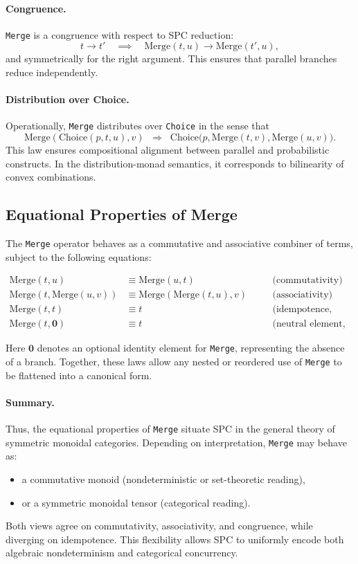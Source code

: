 \documentclass{article}
\begin{document}
\paragraph{Congruence.}
\texttt{Merge} is a congruence with respect to SPC reduction:
\[
t \to t' \quad\implies\quad
\mathrm{Merge}(t,u) \to \mathrm{Merge}(t',u),
\]
and symmetrically for the right argument. This ensures that parallel branches 
reduce independently.

\paragraph{Distribution over Choice.}
Operationally, \texttt{Merge} distributes over \texttt{Choice} in the sense that
\[
\mathrm{Merge}(\mathrm{Choice}(p,t,u),v) 
\;\;\Rightarrow\;\;
\mathrm{Choice}\big(p,\mathrm{Merge}(t,v),\mathrm{Merge}(u,v)\big).
\]
This law ensures compositional alignment between parallel and probabilistic 
constructs. In the distribution-monad semantics, it corresponds to bilinearity 
of convex combinations.
\subsection{Equational Properties of Merge}

The \texttt{Merge} operator behaves as a commutative and associative 
combiner of terms, subject to the following equations:

\begin{align*}
\mathrm{Merge}(t,u) &\equiv \mathrm{Merge}(u,t) \quad &&\text{(commutativity)} \\
\mathrm{Merge}(t,\mathrm{Merge}(u,v)) &\equiv \mathrm{Merge}(\mathrm{Merge}(t,u),v) 
  \quad &&\text{(associativity)} \\
\mathrm{Merge}(t,t) &\equiv t \quad &&\text{(idempotence, optional)} \\
\mathrm{Merge}(t,\mathbf{0}) &\equiv t \quad &&\text{(neutral element, if defined)}
\end{align*}

Here $\mathbf{0}$ denotes an optional identity element for \texttt{Merge}, 
representing the absence of a branch. Together, these laws allow any nested 
or reordered use of \texttt{Merge} to be flattened into a canonical form.

\paragraph{Summary.}
Thus, the equational properties of \texttt{Merge} situate SPC in the general 
theory of symmetric monoidal categories. Depending on interpretation, 
\texttt{Merge} may behave as:
\begin{itemize}
  \item a commutative monoid (nondeterministic or set-theoretic reading),
  \item or a symmetric monoidal tensor (categorical reading).
\end{itemize}
Both views agree on commutativity, associativity, and congruence, while diverging 
on idempotence. This flexibility allows SPC to uniformly encode both algebraic 
nondeterminism and categorical concurrency.
\end{document}
